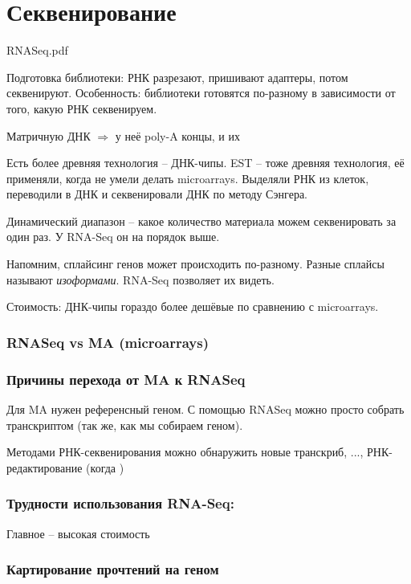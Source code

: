 \documentclass[main.tex]{subfiles}
\begin{document}
\section{Секвенирование }
RNASeq.pdf

Подготовка библиотеки: РНК разрезают, пришивают адаптеры, потом секвенируют.
Особенность: библиотеки готовятся по-разному в зависимости от того, какую РНК секвенируем.

Матричную ДНК $\Rightarrow$ у неё poly-A концы, и их

Есть более древняя технология -- ДНК-чипы.
EST -- тоже древняя технология, её применяли, когда не умели делать microarrays. Выделяли РНК из клеток, переводили в ДНК и секвенировали ДНК по методу Сэнгера.

Динамический диапазон -- какое количество материала можем секвенировать за один раз.
У RNA-Seq он на порядок выше.

Напомним, сплайсинг генов может происходить по-разному.
Разные сплайсы называют \emph{изоформами}.
RNA-Seq позволяет их видеть. %

Стоимость: ДНК-чипы гораздо более дешёвые по сравнению с microarrays.

\subsubsection{RNASeq vs MA (microarrays)}


\subsubsection{Причины перехода от MA к RNASeq}

Для MA нужен референсный геном.
С помощью RNASeq можно просто собрать транскриптом (так же, как мы собираем геном).

Методами РНК-секвенирования можно обнаружить новые транскриб, ..., РНК-редактирование (когда ) %

\subsubsection{Трудности использования RNA-Seq:}

Главное -- высокая стоимость

\subsubsection{Картирование прочтений на геном}
\end{document}
